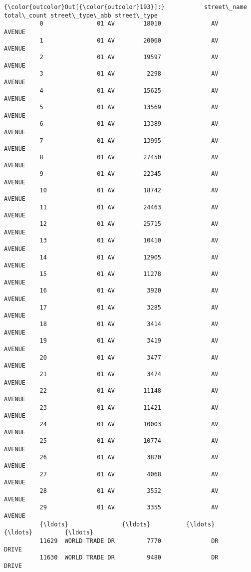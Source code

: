 \documentclass[11pt]{article}
\begin{document}
\begin{Verbatim}[commandchars=\\\{\}]
{\color{outcolor}Out[{\color{outcolor}193}]:}           street\_name  total\_count street\_type\_abb street\_type
          0               01 AV        18010              AV      AVENUE
          1               01 AV        20060              AV      AVENUE
          2               01 AV        19597              AV      AVENUE
          3               01 AV         2298              AV      AVENUE
          4               01 AV        15625              AV      AVENUE
          5               01 AV        13569              AV      AVENUE
          6               01 AV        13389              AV      AVENUE
          7               01 AV        13995              AV      AVENUE
          8               01 AV        27450              AV      AVENUE
          9               01 AV        22345              AV      AVENUE
          10              01 AV        18742              AV      AVENUE
          11              01 AV        24463              AV      AVENUE
          12              01 AV        25715              AV      AVENUE
          13              01 AV        10410              AV      AVENUE
          14              01 AV        12905              AV      AVENUE
          15              01 AV        11278              AV      AVENUE
          16              01 AV         3920              AV      AVENUE
          17              01 AV         3285              AV      AVENUE
          18              01 AV         3414              AV      AVENUE
          19              01 AV         3419              AV      AVENUE
          20              01 AV         3477              AV      AVENUE
          21              01 AV         3474              AV      AVENUE
          22              01 AV        11148              AV      AVENUE
          23              01 AV        11421              AV      AVENUE
          24              01 AV        10003              AV      AVENUE
          25              01 AV        10774              AV      AVENUE
          26              01 AV         3820              AV      AVENUE
          27              01 AV         4068              AV      AVENUE
          28              01 AV         3552              AV      AVENUE
          29              01 AV         3355              AV      AVENUE
          {\ldots}               {\ldots}          {\ldots}             {\ldots}         {\ldots}
          11629  WORLD TRADE DR         7770              DR       DRIVE
          11630  WORLD TRADE DR         9480              DR       DRIVE

\end{Verbatim}
\end{document}
